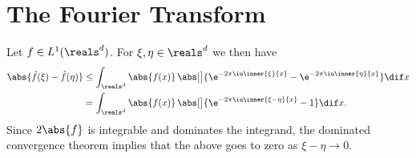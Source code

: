 \documentclass[article, a4paper, 11pt, oneside]{memoir}
\numberwithin{equation}{chapter}
\theoremstyle{nonumberplain}
\begin{document}
\section{The Fourier Transform}

\begin{remarkbreak}
	Let $f \in L^1(\reals^d)$. For $\xi, \eta \in \reals^d$ we then have
	\begin{align*}
		\abs{ \hat f(\xi) - \hat f(\eta) }
			&\leq \int_{\reals^d} \abs{f(x)} \, \abs[\big]{ \e^{-2\pi \iu \inner{\xi}{x}} - \e^{-2\pi \iu \inner{\eta}{x}} } \dif x \\
			&= \int_{\reals^d} \abs{f(x)} \, \abs[\big]{ \e^{-2\pi \iu \inner{\xi-\eta}{x}} - 1} \dif x.
	\end{align*}
	Since $2\abs{f}$ is integrable and dominates the integrand, the dominated convergence theorem implies that the above goes to zero as $\xi-\eta \to 0$.
\end{remarkbreak}
\end{document}
